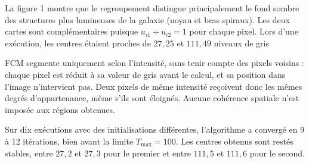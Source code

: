﻿\documentclass[10pt,a4paper]{article}
\begin{document}
La figure 1 montre que le regroupement distingue principalement le fond sombre des structures plus lumineuses de la galaxie (noyau et bras spiraux). Les deux cartes sont complémentaires puisque $u_{i1}+u_{i2}=1$ pour chaque pixel. Lors d'une exécution, les centres étaient proches de $27{,}25$ et $111{,}49$ niveaux de gris

FCM segmente uniquement selon l'intensité, sans tenir compte des pixels voisins : chaque pixel est réduit à sa valeur de gris avant le calcul, et sa position dans l'image n'intervient pas. Deux pixels de même intensité reçoivent donc les mêmes degrés d'appartenance, même s'ils sont éloignés. Aucune cohérence spatiale n'est imposée aux régions obtenues.

Sur dix exécutions avec des initialisations différentes, l'algorithme a convergé en 9 à 12 itérations, bien avant la limite $T_{\max}=100$. Les centres obtenus sont restés stables, entre $27{,}2$ et $27{,}3$ pour le premier et entre $111{,}5$ et $111{,}6$ pour le second.
\end{document}
